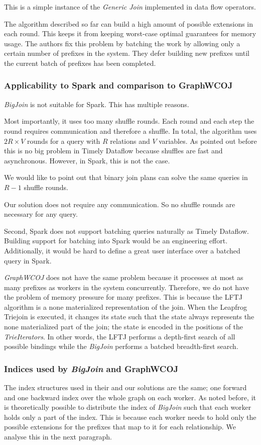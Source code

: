 This is a simple instance of the \textit{Generic Join} implemented in data flow operators.

The algorithm described so far can build a high amount of possible extensions in each round.
This keeps it from keeping worst-case optimal guarantees for memory usage.
The authors fix this problem by batching the work by allowing only a certain number of prefixes in the system.
They defer building new prefixes until the current batch of prefixes has been completed.

\subsubsection{Applicability to Spark and comparison to GraphWCOJ}
\textit{BigJoin} is not suitable for Spark.
This has multiple reasons.

Most importantly, it uses too many shuffle rounds.
Each round and each step the round requires communication and therefore a shuffle.
In total, the algorithm uses $2R \times V$ rounds for a query with $R$ relations and $V$ variables.
As pointed out before this is no big problem in Timely Dataflow because shuffles are fast and asynchronous.
However, in Spark, this is not the case.

We would like to point out that binary join plans can solve the same queries in $R - 1$ shuffle rounds.

Our solution does not require any communication.
So no shuffle rounds are necessary for any query.

Second, Spark does not support batching queries naturally as Timely Dataflow.
Building support for batching into Spark would be an engineering effort.
Additionally, it would be hard to define a great user interface over a batched query in Spark.

\textit{GraphWCOJ} does not have the same problem because it processes at most as many prefixes as workers in the system concurrently.
Therefore, we do not have the problem of memory pressure for many prefixes.
This is because the \textsc{LFTJ} algorithm is a none materialized representation of the join.
When the Leapfrog Triejoin is executed, it changes its state such that the state always represents the none materialized
part of the join;
the state is encoded in the positions of the \textit{TrieIterators}.
In other words, the \textsc{LFTJ} performs a depth-first search of all possible bindings while the \textit{BigJoin}
performs a batched breadth-first search.

\subsubsection{Indices used by \textit{BigJoin} and GraphWCOJ}
The index structures used in their and our solutions are the same; one forward and one backward index over the whole graph on each
worker.
As noted before, it is theoretically possible to distribute the index of \textit{BigJoin} such that each worker holds only a part
of the index.
This is because each worker needs to hold only the possible extensions for the prefixes that map to it for each relationship.
We analyse this in the next paragraph.

